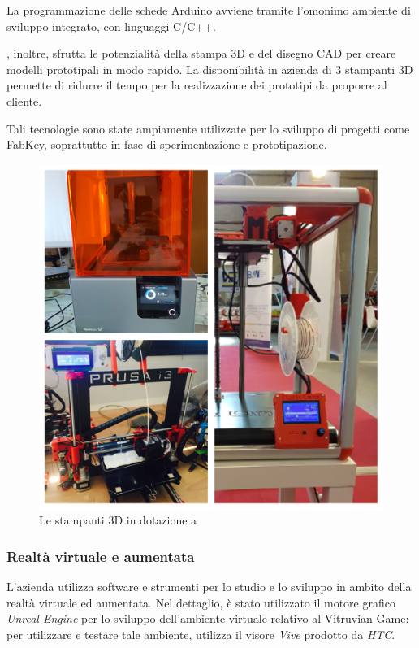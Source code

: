 La programmazione delle schede Arduino avviene tramite l'omonimo ambiente di sviluppo integrato, con linguaggi C/C++.

\lab{}, inoltre, sfrutta le potenzialità della stampa 3D e del disegno CAD per creare modelli prototipali in modo rapido. La disponibilità in azienda di 3 stampanti 3D permette di ridurre il tempo per la realizzazione dei prototipi da proporre al cliente.

Tali tecnologie sono state ampiamente utilizzate per lo sviluppo di progetti come FabKey, soprattutto in fase di sperimentazione e prototipazione.
\begin{figure}[H]
	\begin{center}
	\includegraphics[scale=0.07]{immagini/stampanti.jpg}
	\caption{Le stampanti 3D in dotazione a \lab{}}
	\end{center}
\end{figure}
\subsubsection{Realtà virtuale e aumentata}
L'azienda utilizza software e strumenti per lo studio e lo sviluppo in ambito della realtà virtuale ed aumentata.
Nel dettaglio, è stato utilizzato il motore grafico \textit{Unreal Engine} per lo sviluppo dell'ambiente virtuale relativo al Vitruvian Game: per utilizzare e testare tale ambiente, \lab{} utilizza il visore \textit{Vive} prodotto da \textit{HTC}.

